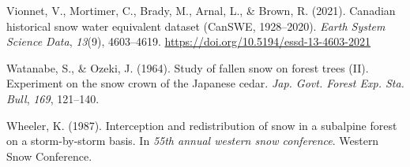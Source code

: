 \documentclass[
  letterpaper,
  DIV=11,
  numbers=noendperiod]{scrartcl}
\newlength{\cslhangindent}
\newenvironment{CSLReferences}[2] %
 {\begin{list}{}{%
  \setlength{\itemindent}{0pt}
  \setlength{\leftmargin}{0pt}
  \setlength{\parsep}{0pt}
  \ifodd #1
   \setlength{\leftmargin}{\cslhangindent}
   \setlength{\itemindent}{-1\cslhangindent}
  \fi
  \setlength{\itemsep}{#2\baselineskip}}}
 {\end{list}}
\begin{document}
\begin{CSLReferences}{1}{0}
Vionnet, V., Mortimer, C., Brady, M., Arnal, L., \& Brown, R. (2021).
Canadian historical snow water equivalent dataset ({CanSWE},
1928--2020). \emph{Earth System Science Data}, \emph{13}(9), 4603--4619.
\url{https://doi.org/10.5194/essd-13-4603-2021}

Watanabe, S., \& Ozeki, J. (1964). Study of fallen snow on forest trees
({II}). {Experiment} on the snow crown of the {Japanese} cedar.
\emph{Jap. Govt. Forest Exp. Sta. Bull}, \emph{169}, 121--140.

Wheeler, K. (1987). Interception and redistribution of snow in a
subalpine forest on a storm-by-storm basis. In \emph{55th annual western
snow conference}. Western Snow Conference.

\end{CSLReferences}
\end{document}

